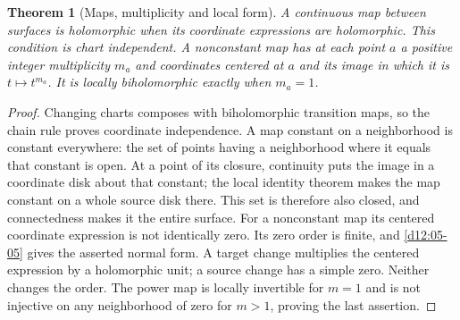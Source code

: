 \documentclass[11pt,a4paper,openany]{book}
\newtheorem{theorem}{Theorem}[chapter]
\theoremstyle{definition}
\theoremstyle{remark}\newtheorem{remark}[theorem]{Remark}
\newcommand{\family}[1]{}
\begin{document}
\begin{theorem}[Maps, multiplicity and local form]\label{d12:20-03}\family{D12.20.03}
A continuous map between surfaces is holomorphic when its coordinate expressions are
holomorphic. This condition is chart independent. A nonconstant map has
at each point $a$ a positive integer multiplicity $m_a$ and coordinates
centered at $a$ and its image in which it is $t\mapsto t^{m_a}$.
It is locally biholomorphic exactly when $m_a=1$.
\end{theorem}
\begin{proof}
Changing charts composes with biholomorphic transition maps, so the chain
rule proves coordinate independence. A map constant on a neighborhood is
constant everywhere: the set of points having a neighborhood where it
equals that constant is open. At a point of its closure, continuity puts
the image in a coordinate disk about that constant; the local identity
theorem makes the map constant on a whole source disk there. This set is
therefore also closed, and connectedness makes it the entire surface.
For a nonconstant map its centered coordinate expression is not identically
zero. Its zero order is finite, and \cref{d12:05-05} gives the asserted
normal form. A target change multiplies the centered expression by a
holomorphic unit; a source change has a simple zero. Neither changes the
order. The power map is locally invertible for $m=1$ and is not injective
on any neighborhood of zero for $m>1$, proving the last assertion.
\end{proof}
\end{document}
